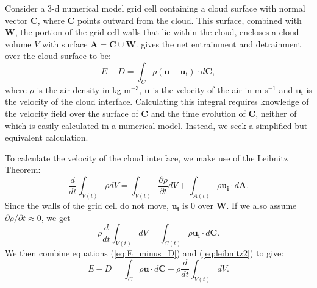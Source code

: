 \documentclass[12pt]{article}
\begin{document}
Consider a 3-d numerical model grid cell containing a cloud surface with 
normal vector $\mathbf{C}$, where $\mathbf{C}$ points outward from the cloud.
This surface, combined with $\mathbf{W}$, the portion of the grid cell walls
that lie within the cloud, encloses a cloud volume $V$ with surface $\mathbf{A}
= \mathbf{C} \cup \mathbf{W}$.  \cite{Siebesma1998} gives the net entrainment and
detrainment over the cloud surface to be:
\begin{equation}
\label{eq:E_minus_D} 
E - D = \int_C \rho ( \mathbf{u} -  \mathbf{u_i}) \cdot d\mathbf{C},
\end{equation}
where $\rho$ is the air density in kg m$^{-3}$, $\mathbf{u}$ is the velocity
of the air in m s$^{-1}$ and $\mathbf{u_i}$ is the velocity of the cloud 
interface.  Calculating this integral requires knowledge of the velocity field
over the surface of $\mathbf{C}$ and the time evolution of $\mathbf{C}$, 
neither of which is easily calculated in a numerical model.  Instead, we seek a
simplified but equivalent calculation.

To calculate the velocity of the cloud interface, we make use of the Leibnitz 
Theorem:
\begin{equation}
\label{eq:leibnitz} 
\frac{d}{dt}\int_{V(t)} \rho dV = 
  \int_{V(t)} \frac{\partial \rho}{ \partial t} dV 
  + \int_{A(t)} \rho \mathbf{u_i}\cdot d\mathbf{A}.
\end{equation}
Since the walls of the grid cell do not move, $\mathbf{u_i}$ is 0 over 
$\mathbf{W}$.  If we also assume ${\partial \rho}/{ \partial t} \approx 0$, we
get
\begin{equation}
\label{eq:leibnitz2} 
    \rho \frac{d}{dt}\int_{V(t)} dV = 
    \int_{C(t)} \rho \mathbf{u_i}\cdot d\mathbf{C}.
\end{equation}
We then combine equations (\ref{eq:E_minus_D}) and (\ref{eq:leibnitz2}) to give:
\begin{equation}
\label{eq:step1} 
      E - D = \int_C \rho \mathbf{u} \cdot d\mathbf{C} 
            - \rho \frac{d}{dt}\int_{V(t)} dV.
\end{equation}
\end{document}
